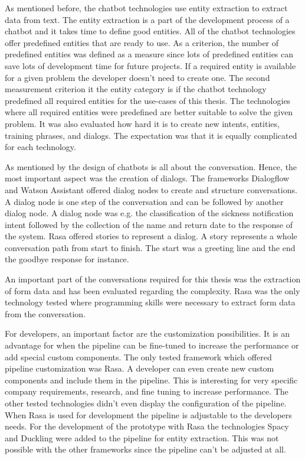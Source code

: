 As mentioned before, the chatbot technologies use entity extraction to extract data from text.
The entity extraction is a part of the development process of a chatbot
and it takes time to define good entities.
All of the chatbot technologies offer predefined entities that are ready to use.
As a criterion, the number of predefined entities was defined as a measure since lots of predefined entities can save lots of development time for future projects.
If a required entity is available for a given problem the developer doesn't need to create one.
The second measurement criterion it the entity category is if the chatbot technology predefined all required entities for the use-cases of this thesis.
The technologies where all required entities were predefined are better suitable to solve the given problem.
It was also evaluated how hard it is to create new intents, entities, training phrases, and dialogs.
The expectation was that it is equally complicated for each technology.

As mentioned by \citet{folstad2017chatbots} the design of chatbots is all about the conversation.
Hence, the most important aspect was the creation of dialogs.
The frameworks Dialogflow and Watson Assistant offered dialog nodes 
to create and structure conversations.
A dialog node is one step of the conversation and can be followed by another dialog node.
A dialog node was e.g. the classification of the sickness notification intent
followed by the collection of the name and return date to the response of the system.
Rasa offered stories to represent a dialog.
A story represents a whole conversation path from start to finish.
The start was a greeting line and the end the goodbye response for instance.

An important part of the conversations required for this thesis was the 
extraction of form data and has been evaluated regarding the 
complexity.
Rasa was the only technology tested where programming skills were necessary to extract form data from the conversation. 

For developers, an important factor are the customization possibilities.
It is an advantage for when the pipeline can be fine-tuned to increase the 
performance or add special custom components.
The only tested framework which offered pipeline customization was Rasa.
A developer can even create new custom components and include them in the pipeline. 
This is interesting for very specific company requirements, research, and fine tuning to increase performance.
The other tested technologies didn't even display the configuration of the pipeline.
When Rasa is used for development the pipeline is adjustable to the 
developers needs.
For the development of the prototype with Rasa the technologies Spacy and Duckling were added to the pipeline for entity extraction.
This was not possible with the other frameworks since the pipeline can't 
be adjusted at all.


